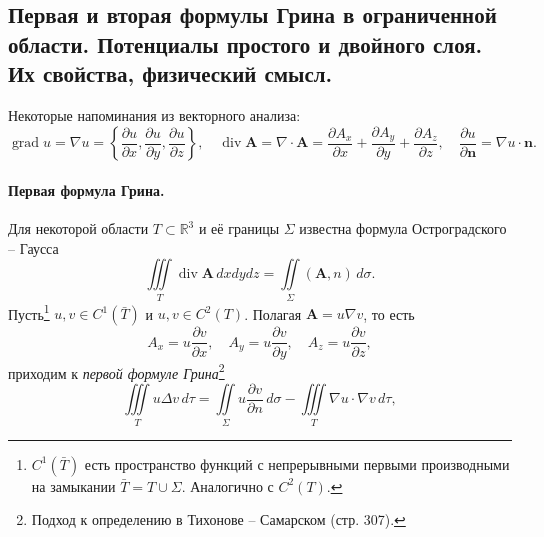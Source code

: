 \subsection{Первая и вторая формулы Грина в ограниченной области. Потенциалы простого и
двойного слоя. Их свойства, физический смысл.}
{\footnotesize Некоторые напоминания из векторного анализа: 
\[
  \operatorname{grad} u = \nabla u = \left\{\frac{\partial u}{\partial x}, \frac{\partial
    u}{\partial y}, \frac{\partial u}{\partial z}\right\},\quad
      \operatorname{div} \mathbf A = \nabla \cdot \mathbf A = \frac{\partial
      A_x}{\partial x} +  \frac{\partial
      A_y}{\partial y} + \frac{\partial
      A_z}{\partial z},\quad
        \frac{\partial u}{\partial \mathbf n} = \nabla u \cdot \mathbf n.
    \]
  }

\paragraph{Первая формула Грина.}
Для некоторой области $ T
\subset
\mathbb R^3$ и
её границы $ \Sigma $ известна формула
Остроградского -- Гаусса 
\[
  \iiint\limits_T \operatorname{div} \mathbf A\, dxdydz = \iint\limits_\Sigma (\mathbf A, n)\,d\sigma.
\]
Пусть\footnote{$ C^1(\bar T) $ есть пространство функций с непрерывными первыми
производными на замыкании $ \bar T = T \cup \Sigma $. Аналогично с $ C^2(T) $.} $ u, v \in C^1(\bar T) $ и $ u, v \in C^2(T) $.
Полагая $ \mathbf A = u\nabla v $, то есть
\[
    A_x = u \frac{\partial v}{\partial x}, \quad A_y = u \frac{\partial
    v}{\partial y}, \quad A_z = u \frac{\partial v}{\partial z},
\]
приходим к \emph{первой формуле Грина}\footnote{Подход к определению в Тихонове
  -- Самарском (стр.
307).} 
\begin{equation}\label{first_green_formula}
  \iiint \limits_T u \Delta v \, d\tau
  = \iint \limits_\Sigma u \dfrac{\partial v}{\partial n} \, d\sigma
    - \iiint \limits_T \nabla u \cdot \nabla v \, d\tau,
\end{equation}

